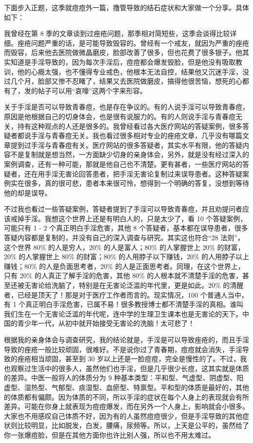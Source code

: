 下面步入正题，这季就痘痘外一篇，撸管导致的结石症状和大家做一个分享。具体如下：

我曾经在第 8 季的文章谈到过痤疮问题，那季相对简短些，这季会谈得比较详细。痤疮问题严重的话，是可能导致毁容的。曾经有一个戒友，就因为严重的痤疮而毁容，后来他去医院做微晶磨皮，脸部改善了很多，但也花费了很多银子。他其实知道是手淫导致的，因为每次手淫后，痘痘都会爆发毁脸，但是他没有吸取教训，他的心瘾太强，也不懂得专业戒色，他根本无法自控，结果他又沉迷手淫，没过几个月，脸部又惨不忍睹了，结果又去医院做磨皮，搞得他很苦恼，想死的心都有了，发的帖子可以用“哀嚎”这两个字来形容。

关于手淫是否可以导致青春痘，也是存在争议的。有的人说手淫可以导致青春痘，原因是他根据自己的切身体会，也是很有说服力的。有的人则说手淫与青春痘无关，持有这种观点的人还是很多的。我曾经看过各大医疗网站的答疑案例，很多答疑者都说手淫与青春痘无关。我也看过很多相对专业的痤疮文章，几乎没有哪篇文章提到过手淫与青春痘有关。医疗网站的很多答疑者，其实水平有限，他的答疑内容不是复制就是想当然，一方面缺少切身的亲身体会，另外，就是没有经过深入的案例调查，还有一种可能，那就是他自己也不清楚。更有甚者，一些医疗网站的答疑者，还在用手淫无害论回答患者，把手淫无害论复制过来误导患者。这种答疑案例实在很多，真的很可悲，患者本来很可怜，想得到一个明确的答复，没想到等待他的却是误导。

不过我也看过一些答疑案例，答疑者提到了手淫可以导致青春痘，并且劝提问者应该戒掉手淫。我想这个世界上还是有明白人的，只是太少了，看 10 个答疑案例，可能只有 1 - 2 个真正明白手淫危害，其他 8 个答疑者，基本都在误导患者，很多答疑内容都是复制的，并没有自己的深入调查与研究。其实这也符合“28 法则”，这个世界 80\% 的人是穷人，20\% 的人是富人；80\% 的人掌握世上 20\% 的财富，20\% 的人掌握世上 80\% 的财富；80\% 的人用脖子以下赚钱，20\% 的人用脖子以上赚钱；80\% 的人是负面思考者，20\% 的人是正面思考者。同理，在这个世界上，只有 20\% 的人真正了解手淫的危害，其他 80\% 的人根本就不清楚手淫的危害，甚至还被无害论给洗脑了，特别是在无害论泛滥的年代里，更是如此。20\% 的清醒者，已经是顶天了！那是对于医疗工作者而言的。现实情况，100 个普通人当中，有 1 个真正明白手淫危害，已属不易！很多教授博士都不清楚手淫的真相。谁叫我们生在一个无害论泛滥的年代呢，连中学的生理卫生课本也是无害论的天下。中国的青少年一代，从初中就开始接受无害论的洗脑！太可悲了！

根据我的亲身体会与调查研究，我的结论就是，手淫是可以导致痤疮的，而且手淫导致的痤疮一般比较顽固，很难好。不是说你过了青春期，痘痘就会消失，手淫导致的痤疮相当顽固，甚至到 30 岁以上还是一脸痘痘，完全是慢性的了。不过，我也观察过生活中的很多人，虽然他们也手淫，但是几乎很少长痘，这其实就是体质的差异。中医一般将人的体质分为 9 种基本类型：平和型、气虚型、阴虚型、阳虚型、湿热型、气郁型、痰湿型、血瘀型、特禀型。平和型的体质是最好的，其他的体质都有偏颇。因为体质的不同，所以手淫的症状在每个人身上的表现就会有所差异。可能在你身上就表现为痘痘爆发，而在另外一个人身上，影响就会小很多。大家也不用感叹自己体质不好，因为有的人虽然痘痘很少，但是手淫导致的其他症状则比较明显，比如脱发，白发，腰痛，尿频等。所以，上天是公平的，虽然给了你一张爆痘脸，但是在其他方面你也许比别人强，所以也不用太难过。

